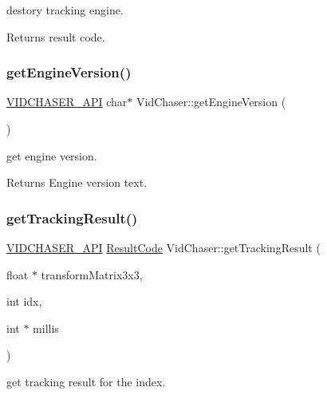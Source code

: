 destory tracking engine. 

\begin{DoxyReturn}{Returns}
result code. 
\end{DoxyReturn}
\mbox{\label{namespace_vid_chaser_a351a56150e8d7cb4a2eb78a5332f6efc}} 
\subsubsection{\texorpdfstring{get\+Engine\+Version()}{getEngineVersion()}}
{\footnotesize\ttfamily \hyperlink{_vid_chaser_a_p_i_8h_abe868bb94e22f611aece5087695f9ef3}{V\+I\+D\+C\+H\+A\+S\+E\+R\+\_\+\+A\+PI} char$\ast$ Vid\+Chaser\+::get\+Engine\+Version (\begin{DoxyParamCaption}{ }\end{DoxyParamCaption})}



get engine version. 

\begin{DoxyReturn}{Returns}
Engine version text. 
\end{DoxyReturn}
\mbox{\label{namespace_vid_chaser_a2174022a70838c9a9ea5c14830961a8c}} 
\subsubsection{\texorpdfstring{get\+Tracking\+Result()}{getTrackingResult()}}
{\footnotesize\ttfamily \hyperlink{_vid_chaser_a_p_i_8h_abe868bb94e22f611aece5087695f9ef3}{V\+I\+D\+C\+H\+A\+S\+E\+R\+\_\+\+A\+PI} \hyperlink{namespace_vid_chaser_a9a65fd4518380d53654f1af799cbf8ed}{Result\+Code} Vid\+Chaser\+::get\+Tracking\+Result (\begin{DoxyParamCaption}\item[{float $\ast$}]{transform\+Matrix3x3,  }\item[{int}]{idx,  }\item[{int $\ast$}]{millis }\end{DoxyParamCaption})}



get tracking result for the index. 


